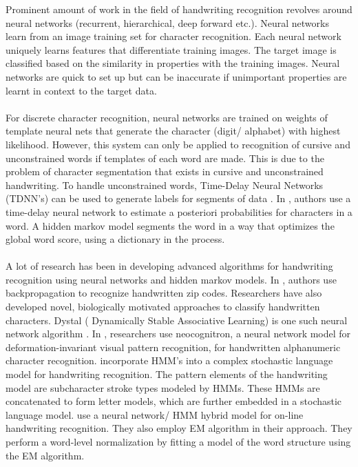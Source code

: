 \documentclass[oribibl]{llncs}
\begin{document}
Prominent amount of work in the field of handwriting recognition revolves around neural networks (recurrent, hierarchical, deep forward etc.). Neural networks learn from an image training set for character recognition. Each neural network uniquely learns features that differentiate training images. The target image is classified based on the similarity in properties with the training images. Neural networks are quick to set up but can be inaccurate if unimportant properties are learnt in context to the target data. 
\\
\\
For discrete character recognition, neural networks are trained on weights of template neural nets that generate the character (digit/ alphabet) with highest likelihood. However, this system can only be applied to recognition of cursive and unconstrained words if templates of each word are made. This is due to the problem of character segmentation that exists in cursive and unconstrained handwriting. To handle unconstrained words, Time-Delay Neural Networks (TDNN's) can be used to generate labels for segments of data \cite{mantas1986overview}. In \cite{tddnn}, authors use a time-delay neural network to estimate a posteriori probabilities for characters in a word. A hidden markov model segments the word in a way that optimizes the global word score, using a dictionary in the process.
\\
\\
A lot of research has been in developing advanced algorithms for handwriting recognition using neural networks and hidden markov models. In \cite{LeCun:1989:BAH:1351079.1351090}, authors use backpropagation to recognize handwritten zip codes. Researchers have also developed novel, biologically motivated approaches to classify handwritten characters. Dystal ( Dynamically Stable Associative Learning) is one such neural network algorithm \cite{Blackwell1992655}. In \cite{97912}, researchers use neocognitron, a neural network model for deformation-invariant visual pattern recognition, for handwritten alphanumeric character recognition. \cite{541414} incorporate HMM's into a complex stochastic language model for handwriting recognition. The pattern elements of the handwriting model are subcharacter stroke types modeled by HMMs. These HMMs are concatenated to form letter models, which are further embedded in a stochastic language model. \cite{Bengio95lerec:a} use a neural network/ HMM hybrid model for on-line handwriting recognition. They also employ EM algorithm in their approach. They perform a word-level normalization by fitting a model of the word structure using the EM algorithm. 
\end{document}
